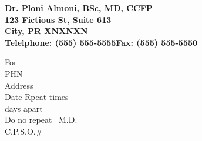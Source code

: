 \documentclass[10pt,onesided]{article}
\begin{document}
	\pagestyle{empty}
	\begin{center}
		\bf\large
		Dr. Ploni Almoni, \normalsize\rm BSc, MD, CCFP\\
		123 Fictious St, Suite 613\\
		City, PR XNXNXN\\
		Telelphone: (555) 555-5555\hfill Fax: (555) 555-5550\\
		\hrulefill
	\end{center}
	For \hrulefill\medskip\\
	PHN \hrulefill\medskip\\
	Address \hrulefill\medskip\\
	\hrulefill
	\noindent\large\textrecipe\normalsize\hspace{0.4\textwidth}
	Date \hrulefill
	\vfill\noindent
	Rpeat \hspace{2em} times\\
	\null\hspace{3em} days apart\\
	Do no repeat
	\hspace{0.35\textwidth}\hrulefill\ M.D.\\
	\null\hspace{0.6\textwidth}C.P.S.O.\# \hrulefill
\end{document}
